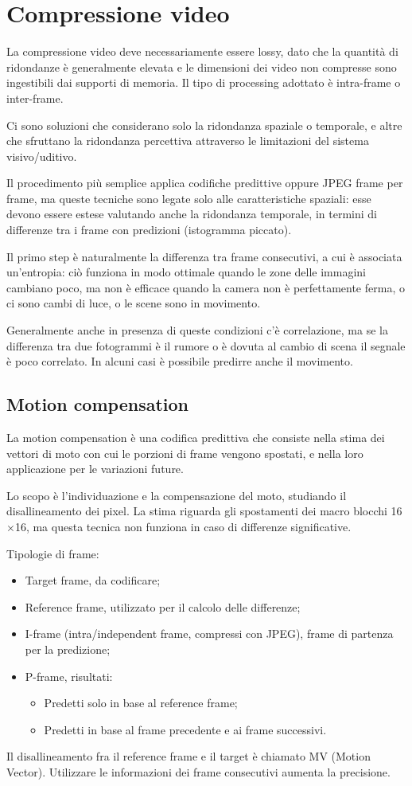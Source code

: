 \section{Compressione video}
La compressione video deve necessariamente essere lossy, dato che la quantità di ridondanze è generalmente elevata e le dimensioni dei video non compresse sono ingestibili dai supporti di memoria. Il tipo di processing adottato è intra-frame o inter-frame. 

Ci sono soluzioni che considerano solo la ridondanza spaziale o temporale, e altre che sfruttano la ridondanza percettiva attraverso le limitazioni del sistema visivo/uditivo. 

Il procedimento più semplice applica codifiche predittive oppure JPEG frame per frame, ma queste tecniche sono legate solo alle caratteristiche spaziali: esse devono essere estese valutando anche la ridondanza temporale, in termini di differenze tra i frame con predizioni (istogramma piccato).

Il primo step è naturalmente la differenza tra frame consecutivi, a cui è associata un'entropia: ciò funziona in modo ottimale quando le zone delle immagini cambiano poco, ma non è efficace quando la camera non è perfettamente ferma, o ci sono cambi di luce, o le scene sono in movimento.

Generalmente anche in presenza di queste condizioni c'è correlazione, ma se la differenza tra due fotogrammi è il rumore o è dovuta al cambio di scena il segnale è poco correlato. In alcuni casi è possibile predirre anche il movimento.

\subsection{Motion compensation}
La motion compensation è una codifica predittiva che consiste nella stima dei vettori di moto con cui le porzioni di frame vengono spostati, e nella loro applicazione per le variazioni future. 

Lo scopo è l'individuazione e la compensazione del moto, studiando il disallineamento dei pixel. La stima riguarda gli spostamenti dei macro blocchi 16$\times$16, ma questa tecnica non funziona in caso di differenze significative.

Tipologie di frame:
\begin{itemize}
	\item Target frame, da codificare;
	\item Reference frame, utilizzato per il calcolo delle differenze;
	\item I-frame (intra/independent frame, compressi con JPEG), frame di partenza per la predizione;
	\item P-frame, risultati:
	\begin{itemize}
		\item Predetti solo in base al reference frame;
		\item Predetti in base al frame precedente e ai frame successivi. 
	\end{itemize}
\end{itemize}
Il disallineamento fra il reference frame e il target è chiamato MV (Motion Vector). Utilizzare le informazioni dei frame consecutivi aumenta la precisione.

